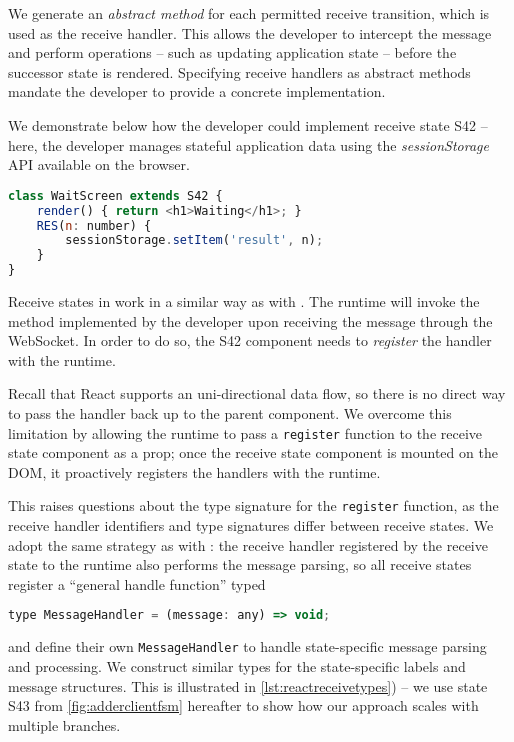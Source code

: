 We generate an \textit{abstract method} 
for each permitted receive
transition, which is used as the receive handler.
This allows the developer to intercept the
message and perform operations -- such as updating
application state -- before the successor state is rendered.
Specifying receive handlers as abstract methods mandate
the developer to provide a concrete implementation.

We demonstrate below how the developer could implement
receive state S42 -- here, the developer manages
stateful application data using the
\textit{sessionStorage} API \cite{SessionStorage}
available on the browser.

\begin{lstlisting}[language=javascript]
class WaitScreen extends S42 {
	render() { return <h1>Waiting</h1>; }
	RES(n: number) {
		sessionStorage.setItem('result', n);
	}
}
\end{lstlisting}

Receive states in 
work in a similar way as with .
The runtime will invoke the  method
implemented by the developer upon receiving the message
through the WebSocket.
In order to do so, the S42 component 
needs to \textit{register}
the handler with the runtime.

Recall that React supports an uni-directional data flow,
so there is no direct way to pass the handler
back up to the parent component.
We overcome this limitation by allowing the
runtime to pass a \texttt{register} function to the
receive state component as a prop; once the receive state
component is mounted on the DOM, it proactively 
registers the handlers with the runtime.

This raises questions about the type signature for the
\texttt{register} function, as the receive handler
identifiers and type signatures differ between receive states.
We adopt the same strategy as with :
the receive handler registered by the receive state
to the runtime also performs the message parsing,
so all receive states register a ``general handle function'' typed

\begin{lstlisting}[language=javascript,numbers=none]
type MessageHandler = (message: any) => void;
\end{lstlisting}

and define their own \texttt{MessageHandler} to handle
state-specific message parsing and processing.
We construct similar types for the state-specific
labels and message structures.
This is illustrated in \cref{lst:reactreceivetypes}) --
we use state S43 from \cref{fig:adderclientfsm} hereafter
to show how our approach scales with multiple branches.

